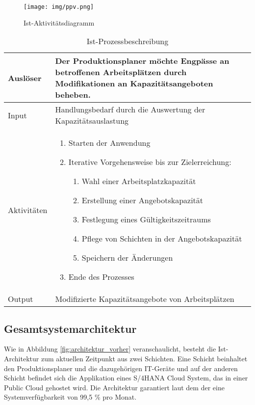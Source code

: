 \begin{figure}[H]
	\centering 
	\texttt{[image: img/ppv.png]}
	\caption[Ist-Aktivitätsdiagramm]
	{\label{fig:prozess_vorher} Ist-Aktivitätsdiagramm}
\end{figure}

\begin{table}[H]
	\centering
	\begin{tabularx}{\textwidth}{|l|X|} 
		\hline
		Auslöser                                     &   
		Der Produktionsplaner möchte Engpässe an betroffenen Arbeitsplätzen durch Modifikationen an Kapazitätsangeboten beheben. \\ 
		\hline\hline
		Input                                         &   
		Handlungsbedarf durch die Auswertung der Kapazitätsauslastung \\ 
		\hline\hline
		Aktivitäten &   
		\begin{minipage}{5in}
		\begin{enumerate} 
		\renewcommand{\labelenumi}{(\arabic{enumi})}
		\item Starten der Anwendung
		\item Iterative Vorgehensweise bis zur Zielerreichung:
    		\begin{enumerate} 
    		\renewcommand{\labelenumi}{(\arabic{enumi})}
    		\item Wahl einer Arbeitsplatzkapazität
    		\item Erstellung einer Angebotskapazität
    		\item Festlegung eines Gültigkeitszeitraums
    		\item Pflege von Schichten in der Angebotskapazität
    		\item Speichern der Änderungen
    		\end{enumerate}
    	\item Ende des Prozesses
		\end{enumerate}
		\vspace{1pt}		\end{minipage} \\
		\hline\hline
		Output                                        &   
		Modifizierte Kapazitätsangebote von Arbeitsplätzen  \\
		\hline
	\end{tabularx}
	\caption{\label{tab:aktivitäten}Ist-Prozessbeschreibung }
\end{table}
% 
% 
% 
% 
% 
% 
\subsection{Gesamtsystemarchitektur}
Wie in Abbildung \ref{fig:architektur_vorher} veranschaulicht, besteht die Ist-Architektur zum aktuellen Zeitpunkt aus zwei Schichten. Eine Schicht beinhaltet den Produktionsplaner und die dazugehörigen \ac{IT}-Geräte und auf der anderen Schicht befindet sich die Applikation eines S/4HANA Cloud System, das in einer Public Cloud gehostet wird. Die Architektur garantiert laut dem  der \citeauthor{sla.2018} eine Systemverfügbarkeit von 99,5 \% pro Monat. 
\autocite{sla.2018} 

